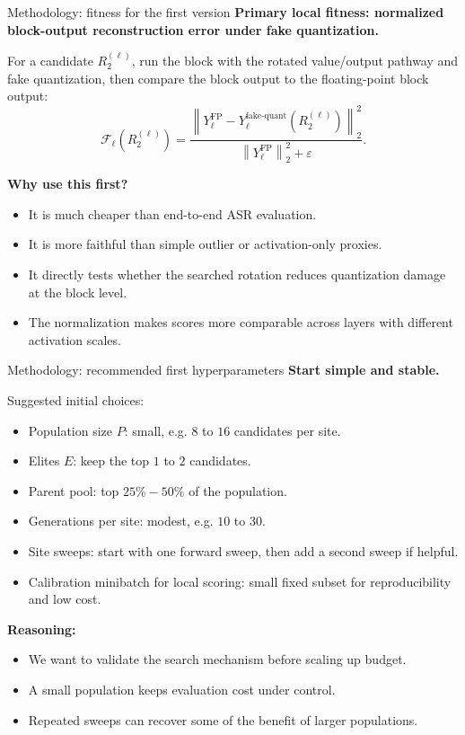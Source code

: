 \documentclass[aspectratio=169,11pt]{beamer}
\begin{document}
\begin{frame}{Methodology: fitness for the first version}
\textbf{Primary local fitness: normalized block-output reconstruction error under fake quantization.}

\vspace{0.2cm}
For a candidate $R_2^{(\ell)}$, run the block with the rotated value/output pathway and fake quantization, then compare the block output to the floating-point block output:
\[
\mathcal F_{\ell}(R_2^{(\ell)}) =
\frac{
\left\|
Y_{\ell}^{\mathrm{FP}} -
Y_{\ell}^{\mathrm{fake\text{-}quant}}(R_2^{(\ell)})
\right\|_2^2
}{
\left\|
Y_{\ell}^{\mathrm{FP}}
\right\|_2^2 + \varepsilon
}.
\]

\vspace{0.2cm}
\textbf{Why use this first?}
\begin{itemize}
  \item It is much cheaper than end-to-end ASR evaluation.
  \item It is more faithful than simple outlier or activation-only proxies.
  \item It directly tests whether the searched rotation reduces quantization damage at the block level.
  \item The normalization makes scores more comparable across layers with different activation scales.
\end{itemize}
\end{frame}

\begin{frame}{Methodology: recommended first hyperparameters}
\textbf{Start simple and stable.}

\vspace{0.2cm}
Suggested initial choices:
\begin{itemize}
  \item Population size $P$: small, e.g. $8$ to $16$ candidates per site.
  \item Elites $E$: keep the top $1$ to $2$ candidates.
  \item Parent pool: top $25\%-50\%$ of the population.
  \item Generations per site: modest, e.g. $10$ to $30$.
  \item Site sweeps: start with one forward sweep, then add a second sweep if helpful.
  \item Calibration minibatch for local scoring: small fixed subset for reproducibility and low cost.
\end{itemize}

\vspace{0.2cm}
\textbf{Reasoning:}
\begin{itemize}
  \item We want to validate the search mechanism before scaling up budget.
  \item A small population keeps evaluation cost under control.
  \item Repeated sweeps can recover some of the benefit of larger populations.
\end{itemize}
\end{frame}
\end{document}
